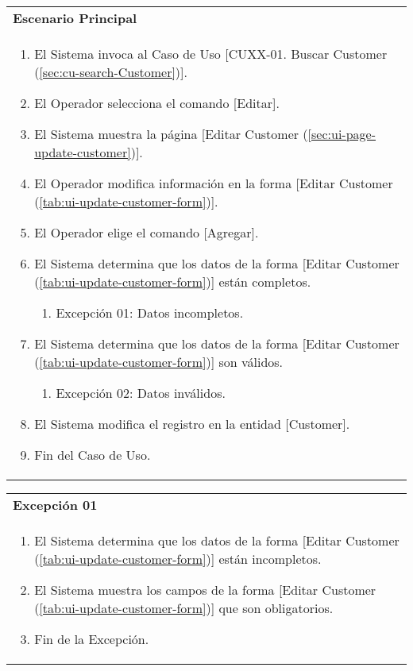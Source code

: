 	\begin{tabular}{ p{15.5cm} }
		\textbf{Escenario Principal} \\
		\begin{enumerate}
			\item El Sistema invoca al Caso de Uso [CUXX-01. Buscar Customer (\ref{sec:cu-search-Customer})].
			\item El Operador selecciona el comando [Editar].
			\item El Sistema muestra la p\'agina [Editar Customer (\ref{sec:ui-page-update-customer})].
			\item El Operador modifica informaci\'on en la forma [Editar Customer (\ref{tab:ui-update-customer-form})].
			\item El Operador elige el comando [Agregar].
			\item El Sistema determina que los datos de la forma [Editar Customer (\ref{tab:ui-update-customer-form})] est\'an completos.
				\begin{enumerate}
					\item Excepci\'on 01: Datos incompletos.
				\end{enumerate}
			\item El Sistema determina que los datos de la forma [Editar Customer (\ref{tab:ui-update-customer-form})] son v\'alidos.
				\begin{enumerate}
					\item Excepci\'on 02: Datos inv\'alidos.
				\end{enumerate}
			\item El Sistema modifica el registro en la entidad [Customer].
			\item Fin del Caso de Uso.
		\end{enumerate}
	\end{tabular}
	
	\begin{tabular}{ p{15.5cm} }
		\textbf{Excepci\'on 01} \\
		\begin{enumerate}
			\item El Sistema determina que los datos de la forma [Editar Customer (\ref{tab:ui-update-customer-form})] est\'an incompletos.
			\item El Sistema muestra los campos de la forma [Editar Customer (\ref{tab:ui-update-customer-form})] que son obligatorios.
			\item Fin de la Excepci\'on.
		\end{enumerate}
	\end{tabular}
	
